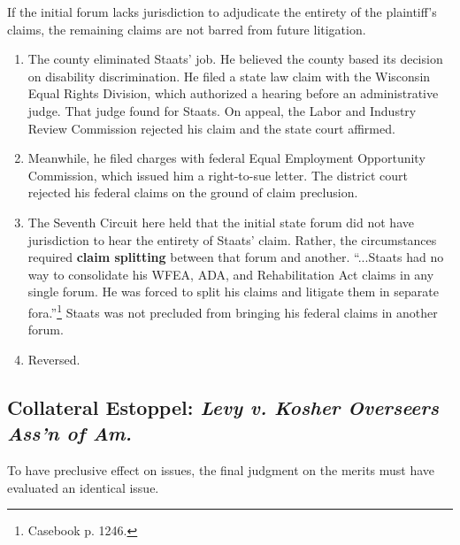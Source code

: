If the initial forum lacks jurisdiction to adjudicate the entirety of the 
plaintiff's claims, the remaining claims are not barred from future 
litigation.

\begin{enumerate}
    \item The county eliminated Staats' job. He believed the county based its 
    decision on disability discrimination. He filed a state law claim with the 
    Wisconsin Equal Rights Division, which authorized a hearing before an 
    administrative judge. That judge found for Staats. On appeal, the Labor 
    and Industry Review Commission rejected his claim and the state court 
    affirmed.
    \item Meanwhile, he filed charges with federal Equal Employment 
    Opportunity Commission, which issued him a right-to-sue letter. The 
    district court rejected his federal claims on the ground of claim 
    preclusion.
    \item The Seventh Circuit here held that the initial state forum 
    did not have jurisdiction to hear the entirety of Staats' claim. Rather, 
    the circumstances required \textbf{claim splitting} between that forum and 
    another. ``...Staats had no way to consolidate his WFEA, ADA, and 
    Rehabilitation Act claims in any single forum. He was forced to split his 
    claims and litigate them in separate fora.''\footnote{Casebook p. 1246.} 
    Staats was not precluded from bringing his federal claims in another 
    forum.
    \item Reversed.
\end{enumerate}

\subsection{Collateral Estoppel: \emph{Levy v. Kosher Overseers Ass'n of Am.}}

To have preclusive effect on issues, the final judgment on the merits must 
have evaluated an identical issue.

